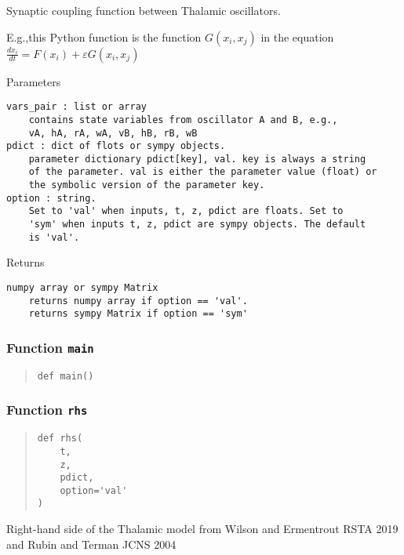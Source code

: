 \documentclass[english,a4paper,oneside]{article}
\begin{document}
Synaptic coupling function between Thalamic oscillators.

E.g.,this Python function is the function \(G(x_i,x_j)\) in the equation
\(\frac{dx_i}{dt} = F(x_i) + \varepsilon G(x_i,x_j)\)

Parameters

\begin{verbatim}
vars_pair : list or array
    contains state variables from oscillator A and B, e.g.,
    vA, hA, rA, wA, vB, hB, rB, wB  
pdict : dict of flots or sympy objects.
    parameter dictionary pdict[key], val. key is always a string
    of the parameter. val is either the parameter value (float) or 
    the symbolic version of the parameter key.
option : string.
    Set to 'val' when inputs, t, z, pdict are floats. Set to
    'sym' when inputs t, z, pdict are sympy objects. The default
    is 'val'.
\end{verbatim}

Returns

\begin{verbatim}
numpy array or sympy Matrix
    returns numpy array if option == 'val'. 
    returns sympy Matrix if option == 'sym'
\end{verbatim}

\hypertarget{Thalamic.main}{%
\subsubsection{\texorpdfstring{Function
\texttt{main}}{Function main}}\label{Thalamic.main}}

\begin{quote}
\begin{verbatim}
def main()
\end{verbatim}
\end{quote}

\hypertarget{Thalamic.rhs}{%
\subsubsection{\texorpdfstring{Function
\texttt{rhs}}{Function rhs}}\label{Thalamic.rhs}}

\begin{quote}
\begin{verbatim}
def rhs(
    t,
    z,
    pdict,
    option='val'
)
\end{verbatim}
\end{quote}

Right-hand side of the Thalamic model from Wilson and Ermentrout RSTA
2019 and Rubin and Terman JCNS 2004
\end{document}

